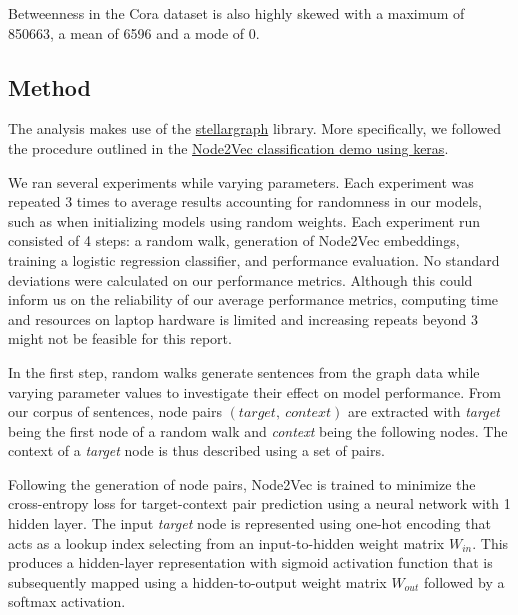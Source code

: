 \documentclass[a4paper,10pt]{article}
\begin{document}
Betweenness in the Cora dataset is also highly skewed with a maximum of 850663, a mean of 6596 and a mode of 0.



\subsection{Method}

The analysis makes use of the \href{https://stellargraph.readthedocs.io}{stellargraph} library. More specifically, we followed the procedure outlined in the \href{https://stellargraph.readthedocs.io/en/stable/demos/node-classification/keras-node2vec-node-classification.html}{Node2Vec classification demo using keras}.

We ran several experiments while varying parameters. Each experiment was repeated 3 times to average results accounting for randomness in our models, such as when initializing models using random weights. Each experiment run consisted of 4 steps: a random walk, generation of Node2Vec embeddings, training a logistic regression classifier, and performance evaluation. No standard deviations were calculated on our performance metrics. Although this could inform us on the reliability of our average performance metrics, computing time and resources on laptop hardware is limited and increasing repeats beyond 3 might not be feasible for this report.

In the first step, random walks generate sentences from the graph data while varying parameter values to investigate their effect on model performance. From our corpus of sentences, node pairs $(target, \ context)$ are extracted with \textit{target} being the first node of a random walk and \textit{context} being the following nodes. The context of a \textit{target} node is thus described using a set of pairs.

Following the generation of node pairs, Node2Vec is trained to minimize the cross-entropy loss for target-context pair prediction using a neural network with 1 hidden layer. The input \textit{target} node is represented using one-hot encoding that acts as a lookup index selecting from an input-to-hidden weight matrix $W_{in}$. This produces a hidden-layer representation with sigmoid activation function that is subsequently mapped using a hidden-to-output weight matrix $W_{out}$ followed by a softmax activation.
\end{document}
